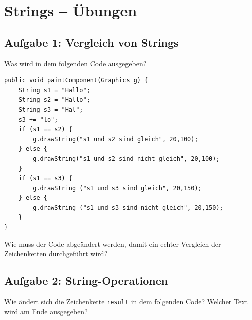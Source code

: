 \clearpage

\rehead[]{\textcolor{lightblue}{AvHG, Inf, My}}
\lohead[]{\textcolor{lightblue}{AvHG, Inf, My}}

\section{Strings -- Übungen}

\subsection{Aufgabe 1: Vergleich von Strings}

\begin{compactenum}[a)]
\item Was wird in dem folgenden Code ausgegeben?

\begin{lstlisting}
public void paintComponent(Graphics g) {
    String s1 = "Hallo";
    String s2 = "Hallo";
    String s3 = "Hal";
    s3 += "lo";
    if (s1 == s2) {
        g.drawString("s1 und s2 sind gleich", 20,100);
    } else {
        g.drawString("s1 und s2 sind nicht gleich", 20,100);
    }
    if (s1 == s3) {
        g.drawString ("s1 und s3 sind gleich", 20,150);
    } else {
        g.drawString ("s1 und s3 sind nicht gleich", 20,150);
    }
}
\end{lstlisting}

\item Wie muss der Code abgeändert werden, damit ein echter Vergleich der
Zeichenketten durchgeführt wird?
\end{compactenum}


\subsection{Aufgabe 2: String-Operationen}

Wie ändert sich die Zeichenkette \lstinline|result| in dem folgenden Code?
Welcher Text wird am Ende ausgegeben?

